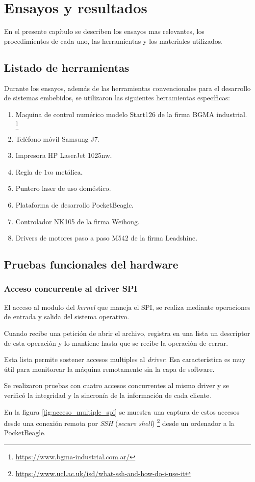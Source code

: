 \chapter{Ensayos y resultados} %
\label{Chapter4}

En el presente capítulo se describen los ensayos mas relevantes, los procedimientos de cada uno, las herramientas y los materiales utilizados.

\section{Listado de herramientas}

Durante los ensayos, además de las herramientas convencionales para el desarrollo de sistemas embebidos, se utilizaron las siguientes herramientas específicas:
\begin{enumerate}
   \item{Maquina de control numérico modelo Start126 de la firma BGMA industrial. \footnote{\url{https://www.bgma-industrial.com.ar/}}}
   \item{Teléfono móvil Samsung J7.}
   \item{Impresora HP LaserJet 1025nw.}
   \item{Regla de $1m$ metálica.}
   \item{Puntero laser de uso doméstico.}
   \item{Plataforma de desarrollo PocketBeagle.}
   \item{Controlador NK105 de la firma Weihong.}
   \item{Drivers de motores paso a paso M542 de la firma Leadshine.}
\end{enumerate}

\section{Pruebas funcionales del hardware}
\label{sec:pruebasHW}

\subsection{Acceso concurrente al driver SPI}
El acceso al modulo del \textit{kernel} que maneja el SPI, se realiza mediante operaciones de entrada y salida del sistema operativo.\par
Cuando recibe una petición de abrir el archivo, registra en una lista un descriptor de esta operación y lo mantiene hasta que se recibe la operación de cerrar. \par
Esta lista permite sostener accesos multiples al \textit{driver}. Esa característica es muy útil para monitorear la máquina remotamente sin la capa de software.\par
Se realizaron pruebas con cuatro accesos concurrentes al mismo driver y se verificó la integridad y la sincronía de la información de cada cliente.\par
En la figura \ref{fig:acceso_multiple_spi} se muestra una captura de estos accesos desde una conexión remota por \textit{SSH} (\textit{secure shell}) \footnote{\url{https://www.ucl.ac.uk/isd/what-ssh-and-how-do-i-use-it}} desde un ordenador a la PocketBeagle.

